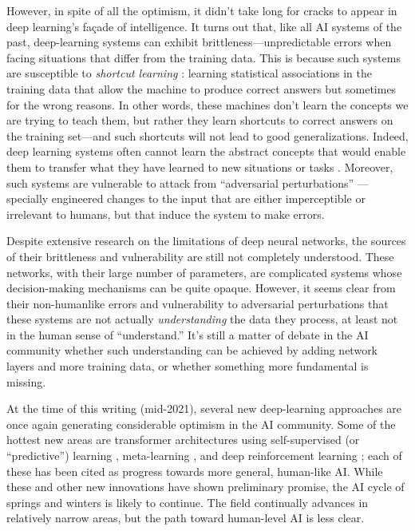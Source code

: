 \documentclass{article}
\begin{document}
However, in spite of all the optimism, it didn't take long for cracks to appear in deep learning's fa\c{c}ade of intelligence. It turns out that, like all AI systems of the past, deep-learning systems can exhibit brittleness---unpredictable errors when facing situations that differ from the training data.  This is because such systems are susceptible to \textit{shortcut learning} \cite{Geirhos2020,Lapuschkin2019}: learning statistical associations in the training data that allow the machine to produce correct answers but sometimes for the wrong reasons.  In other words, these machines  don't learn the concepts we are trying to teach them, but rather they learn shortcuts to correct answers on the training set---and such shortcuts will not lead to good generalizations.  Indeed, deep learning systems often cannot learn the abstract concepts that would enable them to transfer what they have learned to new situations or tasks \cite{Mitchell2021}. Moreover, such systems are vulnerable to attack from ``adversarial perturbations'' \cite{Moosavi2017}---specially engineered changes to the input that are either imperceptible or irrelevant to humans, but that induce the system to make errors.

Despite extensive research on the limitations of deep neural networks, the sources of their brittleness and vulnerability are still not completely understood. These  networks, with their large number of parameters, are complicated systems whose decision-making mechanisms can be quite opaque. However, it seems clear from their non-humanlike errors and vulnerability to adversarial perturbations that these systems are not actually \textit{understanding} the data they process, at least not in the human sense of ``understand.''  It's still a matter of debate in the AI community whether such understanding can be achieved by adding network layers and more training data, or whether something more fundamental is missing.

At the time of this writing (mid-2021), several new deep-learning approaches are once again generating considerable optimism in the AI community.  Some of the hottest new areas are transformer architectures using self-supervised (or ``predictive'') learning \cite{Devlin2018}, meta-learning \cite{Finn2017}, and deep reinforcement learning \cite{Arulkumaran2017}; each of these has been cited as progress towards more general, human-like AI. While these and other new innovations have shown preliminary promise, the AI cycle of springs and winters is likely to continue.  The field continually advances in relatively narrow areas, but the path toward human-level AI is less clear.  
\end{document}
